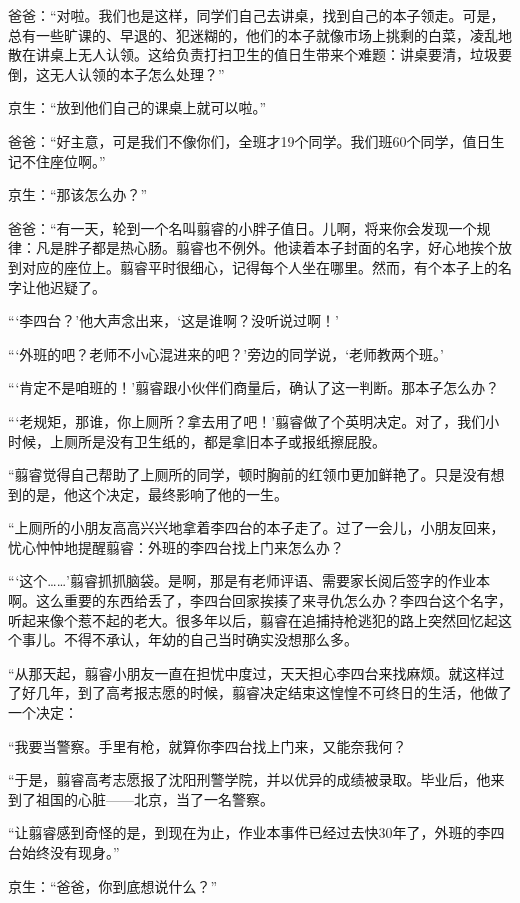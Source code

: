 \documentclass[twoside,openright,headings=optiontohead]{ctexbook} %
\begin{document}
{爸爸：``对啦。我们也是这样，同学们自己去讲桌，找到自己的本子领走。可是，总有一些旷课的、早退的、犯迷糊的，他们的本子就像市场上挑剩的白菜，凌乱地散在讲桌上无人认领。这给负责打扫卫生的值日生带来个难题：讲桌要清，垃圾要倒，这无人认领的本子怎么处理？''

京生：``放到他们自己的课桌上就可以啦。''

爸爸：``好主意，可是我们不像你们，全班才19个同学。我们班60个同学，值日生记不住座位啊。''

京生：``那该怎么办？''

爸爸：``有一天，轮到一个名叫翦睿的小胖子值日。儿啊，将来你会发现一个规律：凡是胖子都是热心肠。翦睿也不例外。他读着本子封面的名字，好心地挨个放到对应的座位上。翦睿平时很细心，记得每个人坐在哪里。然而，有个本子上的名字让他迟疑了。

```李四台？'他大声念出来，`这是谁啊？没听说过啊！'

```外班的吧？老师不小心混进来的吧？'旁边的同学说，`老师教两个班。'

```肯定不是咱班的！'翦睿跟小伙伴们商量后，确认了这一判断。那本子怎么办？

```老规矩，那谁，你上厕所？拿去用了吧！'翦睿做了个英明决定。对了，我们小时候，上厕所是没有卫生纸的，都是拿旧本子或报纸擦屁股。

``翦睿觉得自己帮助了上厕所的同学，顿时胸前的红领巾更加鲜艳了。只是没有想到的是，他这个决定，最终影响了他的一生。

``上厕所的小朋友高高兴兴地拿着李四台的本子走了。过了一会儿，小朋友回来，忧心忡忡地提醒翦睿：外班的李四台找上门来怎么办？

```这个\ldots{}\ldots{}'翦睿抓抓脑袋。是啊，那是有老师评语、需要家长阅后签字的作业本啊。这么重要的东西给丢了，李四台回家挨揍了来寻仇怎么办？李四台这个名字，听起来像个惹不起的老大。很多年以后，翦睿在追捕持枪逃犯的路上突然回忆起这个事儿。不得不承认，年幼的自己当时确实没想那么多。

``从那天起，翦睿小朋友一直在担忧中度过，天天担心李四台来找麻烦。就这样过了好几年，到了高考报志愿的时候，翦睿决定结束这惶惶不可终日的生活，他做了一个决定：

``我要当警察。手里有枪，就算你李四台找上门来，又能奈我何？

``于是，翦睿高考志愿报了沈阳刑警学院，并以优异的成绩被录取。毕业后，他来到了祖国的心脏------北京，当了一名警察。

``让翦睿感到奇怪的是，到现在为止，作业本事件已经过去快30年了，外班的李四台始终没有现身。''

京生：``爸爸，你到底想说什么？''

}
\end{document}
